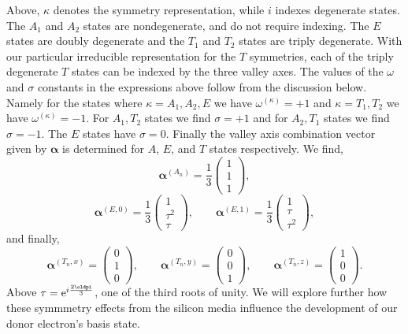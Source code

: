 Above, $\kappa$ denotes the symmetry representation, while $i$ indexes
degenerate states. The $A_{1}$ and $A_{2}$ states are nondegenerate, and do not
require indexing. The $E$ states are doubly degenerate and the $T_{1}$ and
$T_{2}$ states are triply degenerate. With our particular irreducible
representation for the $T$ symmetries, each of the triply degenerate $T$ states
can be indexed by the three valley axes. The values of the $\omega$ and $\sigma$
constants in the expressions above follow from the discussion below. 
Namely for the states where $\kappa = A_{1},A_{2},E$ we have $ \omega^{
\left(\kappa\right) } = +1 $ and $\kappa = T_{1},T_{2}$ we have $ \omega^{
\left(\kappa\right) } = -1 $. 
For $A_{1}, T_{2}$ states we find $\sigma = +1$ and for $A_{2}, T_{1}$ states we
find $\sigma = -1$. The $E$ states have $\sigma = 0$. Finally the valley axis
combination vector given by $\bm{\alpha}$ is determined for $A$, $E$, and $T$
states respectively. We find,
\begin{equation}
  \bm{\alpha}^{\left(A_{n}\right)}
  = \frac{1}{3}\begin{pmatrix} 1 \\ 1 \\ 1 \end{pmatrix},
\end{equation}
\begin{equation}
  \bm{\alpha}^{\left(E,0\right)}
  = \frac{1}{3}\begin{pmatrix} 1 \\ \tau^{2} \\ \tau \end{pmatrix},
\quad\quad
  \bm{\alpha}^{\left(E,1\right)}
  = \frac{1}{3}\begin{pmatrix} 1 \\ \tau \\ \tau^{2} \end{pmatrix},
\end{equation}
and finally,
\begin{equation}
  \bm{\alpha}^{\left(T_{n},x\right)} = \begin{pmatrix} 0 \\ 1 \\ 0\end{pmatrix},
\quad\quad
  \bm{\alpha}^{\left(T_{n},y\right)} = \begin{pmatrix} 0 \\ 0 \\ 1\end{pmatrix},
\quad\quad
  \bm{\alpha}^{\left(T_{n},z\right)} = \begin{pmatrix} 1 \\ 0 \\ 0\end{pmatrix}.
\end{equation}
Above $\tau = \mathrm{e}^{\im\frac{2\pi}{3}}$, one of the third roots of unity.
We will explore further how these symmmetry effects from the silicon media
influence the development of our donor electron's basis state.